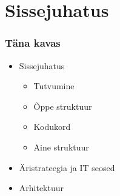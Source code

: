 


\maketitle

\section{Sissejuhatus}
\begin{frame}[fragile]
  \frametitle{Täna kavas}
\begin{itemize}
	\item Sissejuhatus
	\begin{itemize}
		\item Tutvumine
		\item Õppe struktuur
		\item Kodukord
		\item Aine struktuur
	\end{itemize}
	\item Äristrateegia ja IT seosed
	\item Arhitektuur
\end{itemize}
	
\end{frame}

